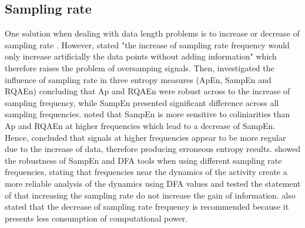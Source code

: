 \subsection{Sampling rate}
One solution when dealing with data length problems is to increase 
or decrease of sampling rate \citep{caballero2014}.
However, \citealt[p. 267]{duarte2008} stated "the increase of sampling rate 
frequency would only increase artificially the data points without 
adding information" which therefore raises the problem of 
oversamping signals. 
Then, \cite{rhea2011} investigated the influence of sampling rate in 
three entropy measures (ApEn, SampEn and RQAEn) concluding that
Ap and RQAEn were robust across to the increase of sampling frequency,
while SampEn presented significant difference across all sampling 
frequencies. \cite{rhea2011} noted that SampEn is more sensitive to 
coliniarities than Ap and RQAEn at higher frequencies which lead to a 
decrease of SampEn. Hence, \cite{rhea2011} concluded that signals at 
higher frequencies appear to be more regular due to the increase of data, 
therefore producing erroneous entropy results.
%
\cite{caballero2013} showed the robustness of SampEn and DFA tools
when using different sampling rate frequencies, stating that frequencies 
near the dynamics of the activity create a more reliable analysis of the 
dynamics using DFA values and tested the statement of \cite{duarte2008} 
that increasing the sampling rate do not increase the gain of information.
\cite{caballero2013} also stated that the decrease of sampling 
rate frequency is recommended because it presents less consumption 
of computational power.






